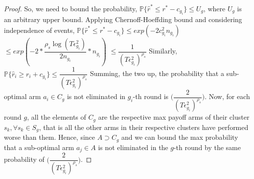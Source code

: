 \begin{proof}
	So, we need to bound the probability,
\newline\hspace*{4em} $\mathbb{P}\lbrace\hat{r}^{*}\leq r^{*} - c_{g_{i}}\rbrace\leq U_{g}$, where $U_{g}$ is an  arbitrary upper bound.
\newline
Applying Chernoff-Hoeffding bound and considering independence of events,
\newline
\newline\hspace*{0em} $\mathbb{P}\lbrace\hat{r}^{*}\leq r^{*} - c_{g_{i}}\rbrace\leq exp(-2c_{g_{i}}^{2}n_{g_{i}})$
\newline\hspace*{8em} $\leq exp(-2 * \dfrac{\rho_{s}\log ( T\epsilon_{g_{i}}^{2})}{2 n_{g_{i}}} *n_{g_{i}})$
\newline\hspace*{8em} $\leq \dfrac{1}{(T\epsilon_{g_{i}}^{2})^{\rho_{s}}}$
\newline
Similarly, $\mathbb{P}\lbrace\hat{r}_{i}\geq r_{i} + c_{g_{i}}\rbrace\leq \dfrac{1}{(T\epsilon_{g_{i}}^{2})^{\rho_{s}}}$
\newline
Summing, the two up, the probability that a sub-optimal arm $a_{i}\in C_{g}$ is not eliminated in $g_{i}$-th round is  $\bigg(\dfrac{2}{(T\epsilon_{g_{i}}^{2})^{\rho_{s}}}\bigg)$. 
\newline Now, for each round $g$, all the elements of $C_{g}$ are the respective max payoff arms of their cluster $s_{k}, \forall s_{k}\in S_{g}$, that is all the other arms in their respective clusters have performed worse than them. Hence, since $A\supset C_{g}$ and we can bound the max probability that a sub-optimal arm $a_{j}\in A$ is not eliminated in the $g$-th round by the same probability of $\bigg(\dfrac{2}{(T\epsilon_{g_{i}}^{2})^{\rho_{s}}}\bigg)$. 

\end{proof}
